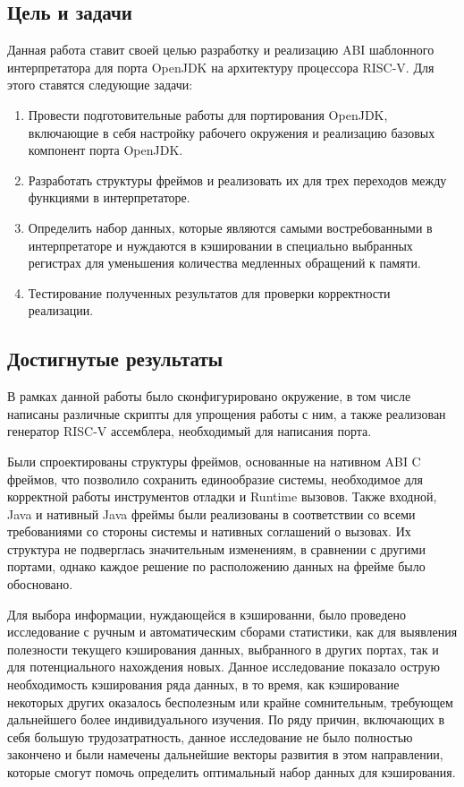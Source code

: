 \subsection*{Цель и задачи}

Данная работа ставит своей целью разработку и реализацию ABI шаблонного интерпретатора для порта OpenJDK на архитектуру процессора RISC-V. Для этого ставятся следующие задачи:

\begin{enumerate}
    \item Провести подготовительные работы для портирования OpenJDK, включающие в себя настройку рабочего окружения и реализацию базовых компонент порта OpenJDK.
    \item Разработать структуры фреймов и реализовать их для трех переходов между функциями в интерпретаторе.
    \item Определить набор данных, которые являются самыми востребованными в интерпретаторе и нуждаются в кэшировании в специально выбранных регистрах для уменьшения количества медленных обращений к памяти.
    \item Тестирование полученных результатов для проверки корректности реализации.
\end{enumerate}




\subsection*{Достигнутые результаты}

В рамках данной работы было сконфигурировано окружение, в том числе написаны различные скрипты для упрощения работы с ним, а также реализован генератор RISC-V ассемблера, необходимый для написания порта.

Были спроектированы структуры фреймов, основанные на нативном ABI C фреймов, что позволило сохранить единообразие системы, необходимое для корректной работы инструментов отладки и Runtime вызовов. Также входной, Java и нативный Java фреймы были реализованы в соответствии со всеми требованиями со стороны системы и нативных соглашений о вызовах. Их структура не подверглась значительным изменениям, в сравнении с другими портами, однако каждое решение по расположению данных на фрейме было обосновано.

Для выбора информации, нуждающейся в кэшированни, было проведено исследование с ручным и автоматическим сборами статистики, как для выявления полезности текущего кэширования данных, выбранного в других портах, так и для потенциального нахождения новых. Данное исследование показало острую необходимость кэширования ряда данных, в то время, как кэширование некоторых других оказалось бесполезным или крайне сомнительным, требующем дальнейшего более индивидуального изучения. По ряду причин, включающих в себя большую трудозатратность, данное исследование не было полностью закончено и были намечены дальнейшие векторы развития в этом направлении, которые смогут помочь определить оптимальный набор данных для кэширования.

